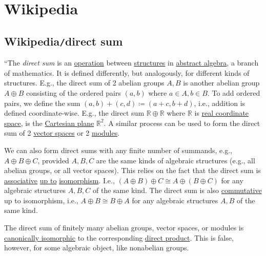 \documentclass{article}
\begin{document}

\section{Wikipedia}

\subsection{Wikipedia{\tt/}direct sum}
``The {\it direct sum} is an \href{https://en.wikipedia.org/wiki/Operation_(mathematics)}{operation} between \href{https://en.wikipedia.org/wiki/Mathematical_structure}{structures} in \href{https://en.wikipedia.org/wiki/Abstract_algebra}{abstract algebra}, a branch of mathematics. It is defined differently, but analogously, for different kinds of structures. E.g., the direct sum of 2 abelian groups $A,B$ is another abelian group $A\oplus B$ consisting of the ordered pairs $(a,b)$ where $a\in A,b\in B$. To add ordered pairs, we define the sum $(a,b) + (c,d)\coloneqq(a + c,b + d)$, i.e., addition is defined coordinate-wise. E.g., the direct sum $\mathbb{R}\oplus\mathbb{R}$ where $\mathbb{R}$ is \href{https://en.wikipedia.org/wiki/Real_coordinate_space}{real coordinate space}, is the \href{https://en.wikipedia.org/wiki/Cartesian_plane}{Cartesian plane} $\mathbb{R}^2$. A similar process can be used to form the direct sum of 2 \href{https://en.wikipedia.org/wiki/Vector_space}{vector spaces} or 2 \href{https://en.wikipedia.org/wiki/Module_(mathematics)}{modules}.

We can also form direct sums with any finite number of summands, e.g., $A\oplus B\oplus C$, provided $A,B,C$ are the same kinds of algebraic structures (e.g., all abelian groups, or all vector spaces). This relies on the fact that the direct sum is \href{https://en.wikipedia.org/wiki/Associative}{associative} \href{https://en.wikipedia.org/wiki/Up_to}{up to} \href{https://en.wikipedia.org/wiki/Isomorphism}{isomorphism}. I.e., $(A\oplus B)\oplus C\cong A\oplus(B\oplus C)$ for any algebraic structures $A,B,C$ of the same kind. The direct sum is also \href{https://en.wikipedia.org/wiki/Commutative}{commutative} up to isomorphism, i.e., $A\oplus B\cong B\oplus A$ for any algebraic structures $A,B$ of the same kind.

The direct sum of finitely many abelian groups, vector spaces, or modules is \href{https://en.wikipedia.org/wiki/Isomorphism}{canonically isomorphic} to the corresponding \href{https://en.wikipedia.org/wiki/Direct_product}{direct product}. This is false, however, for some algebraic object, like nonabelian groups.
\end{document}
